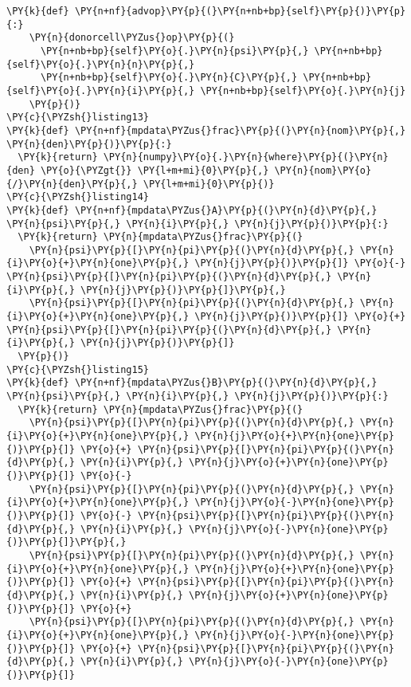 \begin{Verbatim}[commandchars=\\\{\}]
  \PY{k}{def} \PY{n+nf}{advop}\PY{p}{(}\PY{n+nb+bp}{self}\PY{p}{)}\PY{p}{:}
    \PY{n}{donorcell\PYZus{}op}\PY{p}{(}
      \PY{n+nb+bp}{self}\PY{o}{.}\PY{n}{psi}\PY{p}{,} \PY{n+nb+bp}{self}\PY{o}{.}\PY{n}{n}\PY{p}{,} 
      \PY{n+nb+bp}{self}\PY{o}{.}\PY{n}{C}\PY{p}{,} \PY{n+nb+bp}{self}\PY{o}{.}\PY{n}{i}\PY{p}{,} \PY{n+nb+bp}{self}\PY{o}{.}\PY{n}{j}
    \PY{p}{)}
\PY{c}{\PYZsh{}listing13}
\PY{k}{def} \PY{n+nf}{mpdata\PYZus{}frac}\PY{p}{(}\PY{n}{nom}\PY{p}{,} \PY{n}{den}\PY{p}{)}\PY{p}{:}
  \PY{k}{return} \PY{n}{numpy}\PY{o}{.}\PY{n}{where}\PY{p}{(}\PY{n}{den} \PY{o}{\PYZgt{}} \PY{l+m+mi}{0}\PY{p}{,} \PY{n}{nom}\PY{o}{/}\PY{n}{den}\PY{p}{,} \PY{l+m+mi}{0}\PY{p}{)}
\PY{c}{\PYZsh{}listing14}
\PY{k}{def} \PY{n+nf}{mpdata\PYZus{}A}\PY{p}{(}\PY{n}{d}\PY{p}{,} \PY{n}{psi}\PY{p}{,} \PY{n}{i}\PY{p}{,} \PY{n}{j}\PY{p}{)}\PY{p}{:}
  \PY{k}{return} \PY{n}{mpdata\PYZus{}frac}\PY{p}{(}
    \PY{n}{psi}\PY{p}{[}\PY{n}{pi}\PY{p}{(}\PY{n}{d}\PY{p}{,} \PY{n}{i}\PY{o}{+}\PY{n}{one}\PY{p}{,} \PY{n}{j}\PY{p}{)}\PY{p}{]} \PY{o}{-} \PY{n}{psi}\PY{p}{[}\PY{n}{pi}\PY{p}{(}\PY{n}{d}\PY{p}{,} \PY{n}{i}\PY{p}{,} \PY{n}{j}\PY{p}{)}\PY{p}{]}\PY{p}{,}
    \PY{n}{psi}\PY{p}{[}\PY{n}{pi}\PY{p}{(}\PY{n}{d}\PY{p}{,} \PY{n}{i}\PY{o}{+}\PY{n}{one}\PY{p}{,} \PY{n}{j}\PY{p}{)}\PY{p}{]} \PY{o}{+} \PY{n}{psi}\PY{p}{[}\PY{n}{pi}\PY{p}{(}\PY{n}{d}\PY{p}{,} \PY{n}{i}\PY{p}{,} \PY{n}{j}\PY{p}{)}\PY{p}{]}
  \PY{p}{)}
\PY{c}{\PYZsh{}listing15}
\PY{k}{def} \PY{n+nf}{mpdata\PYZus{}B}\PY{p}{(}\PY{n}{d}\PY{p}{,} \PY{n}{psi}\PY{p}{,} \PY{n}{i}\PY{p}{,} \PY{n}{j}\PY{p}{)}\PY{p}{:}
  \PY{k}{return} \PY{n}{mpdata\PYZus{}frac}\PY{p}{(} 
    \PY{n}{psi}\PY{p}{[}\PY{n}{pi}\PY{p}{(}\PY{n}{d}\PY{p}{,} \PY{n}{i}\PY{o}{+}\PY{n}{one}\PY{p}{,} \PY{n}{j}\PY{o}{+}\PY{n}{one}\PY{p}{)}\PY{p}{]} \PY{o}{+} \PY{n}{psi}\PY{p}{[}\PY{n}{pi}\PY{p}{(}\PY{n}{d}\PY{p}{,} \PY{n}{i}\PY{p}{,} \PY{n}{j}\PY{o}{+}\PY{n}{one}\PY{p}{)}\PY{p}{]} \PY{o}{-}
    \PY{n}{psi}\PY{p}{[}\PY{n}{pi}\PY{p}{(}\PY{n}{d}\PY{p}{,} \PY{n}{i}\PY{o}{+}\PY{n}{one}\PY{p}{,} \PY{n}{j}\PY{o}{-}\PY{n}{one}\PY{p}{)}\PY{p}{]} \PY{o}{-} \PY{n}{psi}\PY{p}{[}\PY{n}{pi}\PY{p}{(}\PY{n}{d}\PY{p}{,} \PY{n}{i}\PY{p}{,} \PY{n}{j}\PY{o}{-}\PY{n}{one}\PY{p}{)}\PY{p}{]}\PY{p}{,}
    \PY{n}{psi}\PY{p}{[}\PY{n}{pi}\PY{p}{(}\PY{n}{d}\PY{p}{,} \PY{n}{i}\PY{o}{+}\PY{n}{one}\PY{p}{,} \PY{n}{j}\PY{o}{+}\PY{n}{one}\PY{p}{)}\PY{p}{]} \PY{o}{+} \PY{n}{psi}\PY{p}{[}\PY{n}{pi}\PY{p}{(}\PY{n}{d}\PY{p}{,} \PY{n}{i}\PY{p}{,} \PY{n}{j}\PY{o}{+}\PY{n}{one}\PY{p}{)}\PY{p}{]} \PY{o}{+}
    \PY{n}{psi}\PY{p}{[}\PY{n}{pi}\PY{p}{(}\PY{n}{d}\PY{p}{,} \PY{n}{i}\PY{o}{+}\PY{n}{one}\PY{p}{,} \PY{n}{j}\PY{o}{-}\PY{n}{one}\PY{p}{)}\PY{p}{]} \PY{o}{+} \PY{n}{psi}\PY{p}{[}\PY{n}{pi}\PY{p}{(}\PY{n}{d}\PY{p}{,} \PY{n}{i}\PY{p}{,} \PY{n}{j}\PY{o}{-}\PY{n}{one}\PY{p}{)}\PY{p}{]}

\end{Verbatim}
